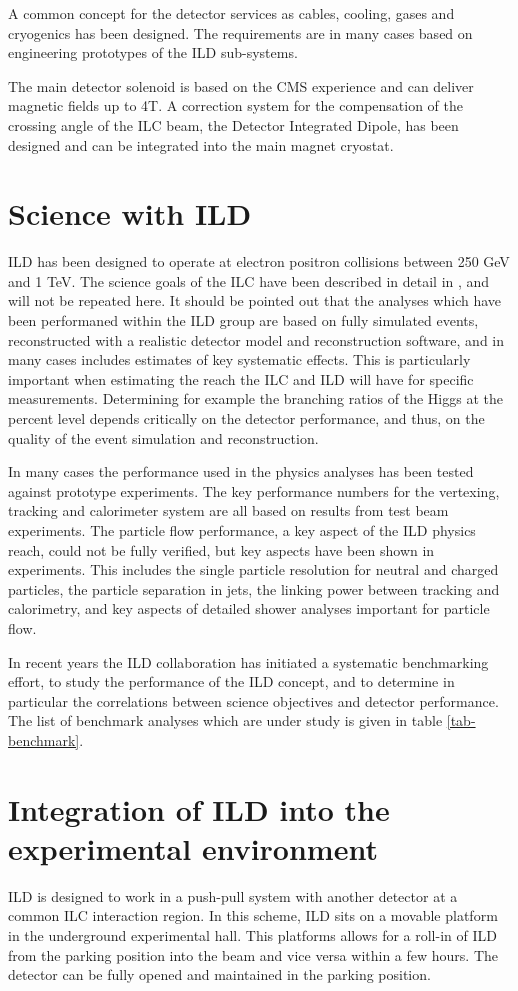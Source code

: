 \documentclass[%
 amsmath,amssymb,
 aps,
]{revtex4-1}
\begin{document}
A common concept for the detector services as cables, cooling, gases and cryogenics has been designed. The requirements are in many cases based on engineering prototypes of the ILD sub-systems. 

The main detector solenoid is based on the CMS experience and can deliver magnetic fields up to 4T. A correction system for the compensation of the crossing angle of the ILC beam, the Detector Integrated Dipole, has been designed and can be integrated into the main magnet cryostat.

\section{Science with ILD}
ILD has been designed to operate at electron positron collisions between 250 GeV and 1 TeV. The science goals of the ILC have been described in detail in \cite{ILCESU1}, and will not be repeated here. It should be pointed out that the analyses which have been performaned within the ILD group are based on fully simulated events, reconstructed with a realistic detector model and reconstruction software, and in many cases includes estimates of key systematic effects. This is particularly important when estimating the reach the ILC and ILD will have for specific measurements. Determining for example the branching ratios of the Higgs at the percent level depends critically on the detector performance, and thus, on the quality of the event simulation and reconstruction. 

In many cases the performance used in the physics analyses has been tested against prototype experiments. The key performance numbers for the vertexing, tracking and calorimeter system are all based on results from test beam experiments. The particle flow performance, a key aspect of the ILD physics reach, could not be fully verified, but key aspects have been shown in experiments. This includes the single particle resolution for neutral and charged particles, the particle separation in jets, the linking power between tracking and calorimetry, and key aspects of detailed shower analyses important for particle flow. 

In recent years the ILD collaboration has initiated a systematic benchmarking effort, to study the performance of the ILD concept, and to determine in particular the correlations between science objectives and detector performance. The list of benchmark analyses which are under study is given in table \ref{tab-benchmark}. 


\section{Integration of ILD into the experimental environment}
ILD is designed to work in a push-pull system with another detector at a common ILC interaction region. In this scheme, ILD sits on a movable platform in the underground experimental hall. This platforms allows for a roll-in of ILD from the parking position into the beam and vice versa within a few hours. The detector can be fully opened and maintained in the parking position.
\end{document}

